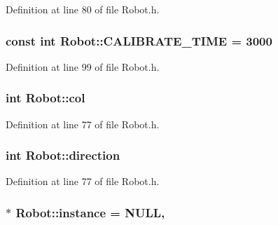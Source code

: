 Definition at line 80 of file Robot.\-h.

\hypertarget{classRobot_ac40abfa06749a68604af90c00e2a3fee}{
\subsubsection[{C\-A\-L\-I\-B\-R\-A\-T\-E\-\_\-\-T\-I\-M\-E}]{\setlength{\rightskip}{0pt plus 5cm}const int Robot\-::\-C\-A\-L\-I\-B\-R\-A\-T\-E\-\_\-\-T\-I\-M\-E = 3000\hspace{0.3cm}{\ttfamily [static]}}}\label{classRobot_ac40abfa06749a68604af90c00e2a3fee}


Definition at line 99 of file Robot.\-h.

\hypertarget{classRobot_a2e08d53491bb82defe2e28ee9ce1d096}{
\subsubsection[{col}]{\setlength{\rightskip}{0pt plus 5cm}int Robot\-::col}}\label{classRobot_a2e08d53491bb82defe2e28ee9ce1d096}


Definition at line 77 of file Robot.\-h.

\hypertarget{classRobot_ac25b4dfc2e9e5aa86ec5684d075d32b8}{
\subsubsection[{direction}]{\setlength{\rightskip}{0pt plus 5cm}int Robot\-::direction}}\label{classRobot_ac25b4dfc2e9e5aa86ec5684d075d32b8}


Definition at line 77 of file Robot.\-h.

\hypertarget{classRobot_aad5c5d6db601aac62393d47ec9385fa3}{
\subsubsection[{instance}]{ $\ast$ Robot\-::instance = N\-U\-L\-L\hspace{0.3cm}{\ttfamily [static]}, {\ttfamily [private]}}}\label{classRobot_aad5c5d6db601aac62393d47ec9385fa3}


